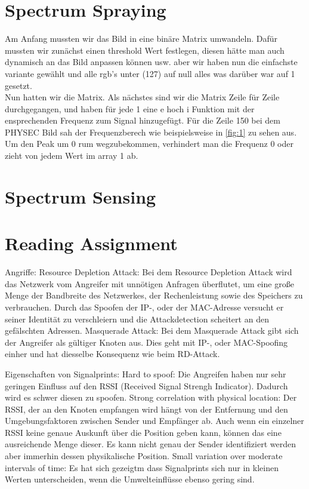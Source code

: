 \documentclass[12pt,a4paper]{article}
\begin{document}
\section{Spectrum Spraying}
Am Anfang mussten wir das Bild in eine binäre Matrix umwandeln. Dafür mussten wir zunächst einen threshold Wert festlegen, diesen hätte man auch dynamisch an das Bild anpassen können usw. aber wir haben nun die einfachste variante gewählt und alle rgb's unter (127) auf null alles was darüber war auf 1 gesetzt. \\
Nun hatten wir die Matrix. Als nächstes sind wir die Matrix Zeile für Zeile durchgegangen, und haben für jede 1 eine e hoch i Funktion mit der ensprechenden Frequenz zum Signal hinzugefügt. Für die Zeile 150 bei dem PHYSEC Bild sah der Frequenzberech wie beispielsweise in \ref{fig:1} zu sehen aus. Um den Peak um 0 rum wegzubekommen, verhindert man die Frequenz 0 oder zieht von jedem Wert im array 1 ab.
\section{Spectrum Sensing}
\section{Reading Assignment}
Angriffe:
	Resource Depletion Attack: 
		Bei dem Resource Depletion Attack wird das Netzwerk vom Angreifer mit unnötigen Anfragen überflutet, um eine große Menge der Bandbreite des Netzwerkes, der Rechenleistung sowie des Speichers zu verbrauchen. Durch das Spoofen der IP-, oder der MAC-Adresse versucht er seiner Identität zu verschleiern und die Attackdetection scheitert an den gefälschten Adressen.
	Masquerade Attack:
		Bei dem Masquerade Attack gibt sich der Angreifer als gültiger Knoten aus. Dies geht mit IP-, oder MAC-Spoofing einher und hat diesselbe Konsequenz wie beim RD-Attack.

Eigenschaften von Signalprints:
	Hard to spoof: 
		Die Angreifen haben nur sehr geringen Einfluss auf den RSSI (Received Signal Strengh Indicator). Dadurch wird es schwer diesen zu spoofen. 
	Strong correlation with physical location:
		Der RSSI, der an den Knoten empfangen wird hängt von der Entfernung und den Umgebungsfaktoren zwischen Sender und Empfänger ab. Auch wenn ein einzelner RSSI keine genaue Auskunft über die Position geben kann, können das eine ausreichende Menge dieser. Es kann nicht genau der Sender identifiziert werden aber immerhin dessen physikalische Position.
	Small variation over moderate intervals of time:
		Es hat sich gezeigtm dass Signalprints sich nur in kleinen Werten unterscheiden, wenn die Umwelteinflüsse ebenso gering sind.
\end{document}
